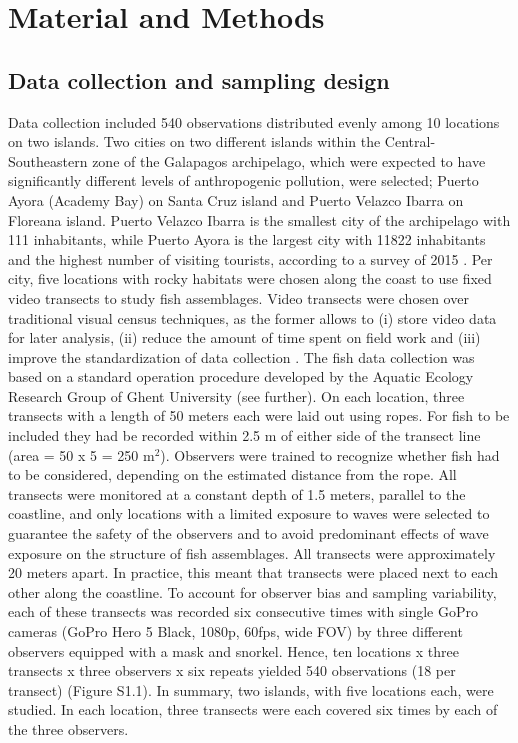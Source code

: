 \section{Material and Methods}
\label{MaterialandMethodsMedianMedia}

\subsection{Data collection and sampling design}

Data collection included 540 observations distributed evenly among 10 locations on two islands. Two cities on two different islands within the Central-Southeastern zone of the Galapagos archipelago, which were expected to have significantly different levels of anthropogenic pollution, were selected; Puerto Ayora (Academy Bay) on Santa Cruz island and Puerto Velazco Ibarra on Floreana island. Puerto Velazco Ibarra is the smallest city of the archipelago with 111 inhabitants, while Puerto Ayora is the largest city with 11822 inhabitants and the highest number of visiting tourists, according to a survey of 2015 \citep{INEC2015Censo2015}. Per city, five locations with rocky habitats were chosen along the coast to use fixed video transects to study fish assemblages. Video transects were chosen over traditional visual census techniques, as the former allows to (i) store video data for later analysis, (ii) reduce the amount of time spent on field work and (iii) improve the standardization of data collection \citep{Mallet2014,Wartenberg2015}. The fish data collection was based on a standard operation procedure developed by the Aquatic Ecology Research Group of Ghent University (see further). On each location, three transects with a length of 50 meters each were laid out using ropes. For fish to be included they had be recorded within 2.5 m of either side of the transect line (area = 50 x 5 = 250 m$^{2}$). Observers were trained to recognize whether fish had to be considered, depending on the estimated distance from the rope. All transects were monitored at a constant depth of 1.5 meters, parallel to the coastline, and only locations with a limited exposure to waves were selected to guarantee the safety of the observers and to avoid predominant effects of wave exposure on the structure of fish assemblages. All transects were approximately 20 meters apart. In practice, this meant that transects were placed next to each other along the coastline. To account for observer bias and sampling variability, each of these transects was recorded six consecutive times with single GoPro cameras (GoPro Hero 5 Black, 1080p, 60fps, wide FOV) by three different observers equipped with a mask and snorkel. Hence, ten locations x three transects x three observers x six repeats yielded 540 observations (18 per transect) (Figure S1.1). In summary, two islands, with five locations each, were studied. In each location, three transects were each covered six times by each of the three observers.

